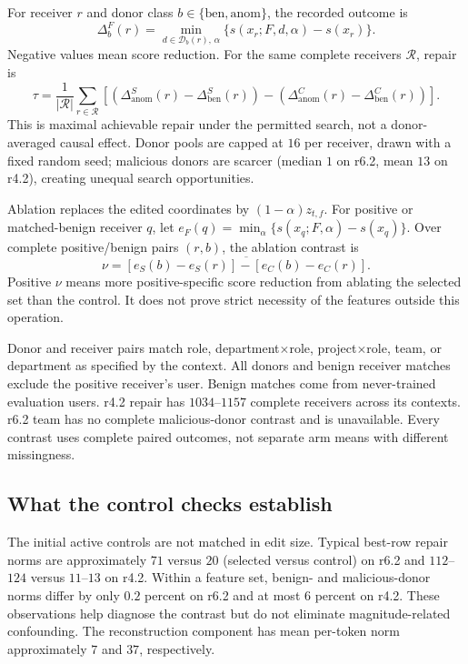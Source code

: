 For receiver $r$ and donor class $b\in\{\mathrm{ben},\mathrm{anom}\}$,
the recorded outcome is
\[
 \Delta^F_b(r)=\min_{d\in\mathcal D_b(r),\,\alpha}
 \{s(x_r;F,d,\alpha)-s(x_r)\}.
\]
Negative values mean score reduction. For the same complete receivers
$\mathcal R$, repair is
\[
 \tau=\frac1{|\mathcal R|}\sum_{r\in\mathcal R}
 \left[(\Delta^S_{\mathrm{anom}}(r)-\Delta^S_{\mathrm{ben}}(r))
 -(\Delta^C_{\mathrm{anom}}(r)-\Delta^C_{\mathrm{ben}}(r))\right].
\]
This is maximal achievable repair under the permitted search, not a
donor-averaged causal effect. Donor pools are capped at $16$ per receiver,
drawn with a fixed random seed; malicious donors are scarcer (median
$1$ on r6.2, mean $13$ on r4.2), creating unequal search opportunities.

Ablation replaces the edited coordinates by $(1-\alpha)z_{t,f}$.
For positive or matched-benign receiver $q$, let
$e_F(q)=\min_\alpha\{s(x_q;F,\alpha)-s(x_q)\}$. Over complete
positive/benign pairs $(r,b)$, the ablation contrast is
\[
 \nu=\overline{[e_S(b)-e_S(r)]-[e_C(b)-e_C(r)]}.
\]
Positive $\nu$ means more positive-specific score reduction from
ablating the selected set than the control. It does not prove strict
necessity of the features outside this operation.

Donor and receiver pairs match role, department$\times$role,
project$\times$role, team, or department as specified by the context.
All donors and benign receiver matches exclude the positive receiver's
user. Benign matches come from never-trained evaluation users.
r4.2 repair has $1034$--$1157$ complete receivers across its contexts.
r6.2 team has no complete malicious-donor contrast and is unavailable.
Every contrast uses complete paired outcomes, not separate arm means
with different missingness.

\subsection{What the control checks establish}

The initial active controls are not matched in edit size. Typical best-row
repair norms are approximately $71$ versus $20$ (selected versus control)
on r6.2 and $112$--$124$ versus $11$--$13$ on r4.2. Within a feature
set, benign- and malicious-donor norms differ by only $0.2$ percent on
r6.2 and at most $6$ percent on r4.2. These observations help diagnose
the contrast but do not eliminate magnitude-related confounding.
The reconstruction component has mean per-token norm approximately
$7$ and $37$, respectively.

